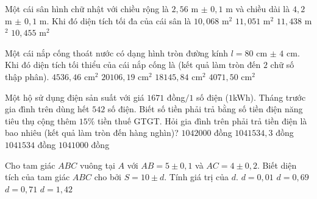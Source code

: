 \begin{ex}%
	Một cái sân hình chữ nhật với chiều rộng là $2{,}56$ m $\pm$ $0{,}1$ m và chiều dài là $4{,}2$ m $\pm$ $0{,}1$ m. Khi đó diện tích tối đa của cái sân là
	\choice
	{$10{,}068$ m$^2$}
	{$11{,}051$ m$^2$}
	{\True $11{,}438$ m$^2$}
	{$10{,}455$ m$^2$}
\end{ex}

\begin{ex}%
	Một cái nắp cống thoát nước có dạng hình tròn đường kính $l=80$ cm $\pm$ $4$ cm. Khi đó diện tích tối thiểu của cái nắp cống là (kết quả làm tròn đến $2$ chữ số thập phân).
	\choice
	{\True $4536{,}46$ cm$^2$}
	{$20106{,}19$ cm$^2$}
	{$18145{,}84$ cm$^2$}
	{$4071{,}50$ cm$^2$}
\end{ex}

\begin{ex}%
	Một hộ sử dụng điện sản suất với giá $1671$ đồng$/ 1$ số điện ($1$kWh). Tháng trước gia đình trên dùng hết $542$ số điện. Biết số tiền phải trả bằng số tiền điện năng tiêu thụ cộng thêm $15\%$ tiền thuế GTGT. Hỏi gia đình trên phải trả tiền điện là bao nhiêu (kết quả làm tròn đến hàng nghìn)?
	\choice
	{\True $1042000$ đồng}
	{$1041534{,}3$ đồng}
	{$1041534$ đồng}
	{$1041000$ đồng}
\end{ex}

\begin{ex}%
	Cho tam giác $ABC$ vuông tại $A$ với $AB = 5\pm 0{,}1$ và $AC = 4\pm 0{,}2$. Biết diện tích của tam giác $ ABC $ cho bởi $S =10\pm d$. Tính giá trị của $d$.
	\choice
	{$d= 0{,}01$}
	{$d= 0{,}69$}
	{\True $d = 0{,}71$}
	{$d=1{,}42$}
\end{ex}

